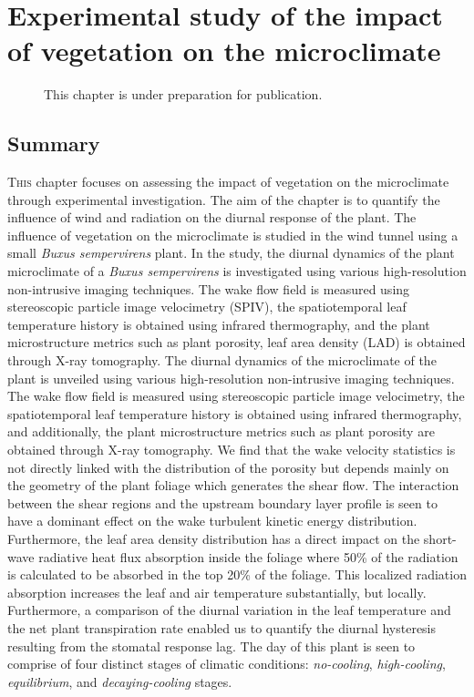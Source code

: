 \chapter{Experimental study of the impact of vegetation on the microclimate}
\label{ch:microclimatestudy}
\def\figdir{chapters/ch04_microclimatestudy/figures}

\begin{figure}[h]
	\centering
	\begin{minipage}{0.9\textwidth}
		\textsf{ \footnotesize This chapter is under preparation for publication.}
	\end{minipage}
\end{figure}
\vspace{2em}

\section{Summary}
\lettrine[lines=3,nindent=0em,loversize=0.1]{T}{his} chapter focuses on assessing the impact of vegetation on the microclimate through experimental investigation. The aim of the chapter is to quantify the influence of wind and radiation on the diurnal response of the plant. The influence of vegetation on the microclimate is studied in the wind tunnel using a small \textit{Buxus sempervirens} plant. In the study, the diurnal dynamics of the plant microclimate of a \textit{Buxus sempervirens} is investigated using various high-resolution non-intrusive imaging techniques. The wake flow field is measured using stereoscopic particle image velocimetry (SPIV), the spatiotemporal leaf temperature history is obtained using infrared thermography, and the plant microstructure metrics such as plant porosity, leaf area density (LAD) is obtained through X-ray tomography. The diurnal dynamics of the microclimate of the plant is unveiled using various high-resolution non-intrusive imaging techniques. The wake flow field is measured using stereoscopic particle image velocimetry, the spatiotemporal leaf temperature history is obtained using infrared thermography, and additionally, the plant microstructure metrics such as plant porosity are obtained through X-ray tomography. We find that the wake velocity statistics is not directly linked with the distribution of the porosity but depends mainly on the geometry of the plant foliage which generates the shear flow. The interaction between the shear regions and the upstream boundary layer profile is seen to have a dominant effect on the wake turbulent kinetic energy distribution. Furthermore, the leaf area density distribution has a direct impact on the short-wave radiative heat flux absorption inside the foliage where 50\% of the radiation is calculated to be absorbed in the top 20\% of the foliage. This localized radiation absorption increases the leaf and air temperature substantially, but locally. Furthermore, a comparison of the diurnal variation in the leaf temperature and the net plant transpiration rate enabled us to quantify the diurnal hysteresis resulting from the stomatal response lag. The day of this plant is seen to comprise of four distinct stages of climatic conditions: \textit{no-cooling}, \textit{high-cooling}, \textit{equilibrium}, and \textit{decaying-cooling} stages.

